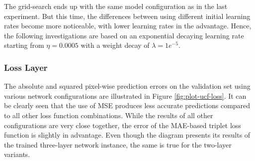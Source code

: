 The grid-search ends up with the same model configuration as in the last experiment. But this time, the differences between using different initial learning rates become more noticeable, with lower learning rates in the advantage. Hence, the following investigations are based on an exponential decaying learning rate starting from $\eta = 0.0005$ with a weight decay of $\lambda = 1e^{-5}$. 


\subsubsection*{Loss Layer}

The absolute and squared pixel-wise prediction errors on the validation set using various network configurations are illustrated in Figure \ref{fig:plot-ucf-loss}. It can be clearly seen that the use of MSE produces less accurate predictions compared to all other loss function combinations. While the results of all other configurations are very close together, the error of the MAE-based triplet loss function is slightly in advantage. Even though the diagram presents its results of the trained three-layer network instance, the same is true for the two-layer variants.

